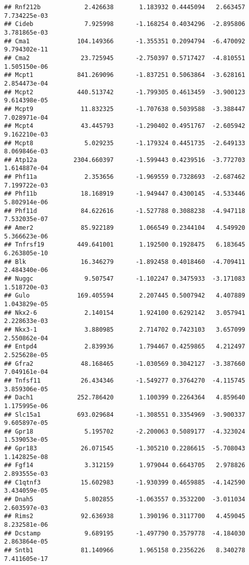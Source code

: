 \documentclass[
]{article}
\begin{document}
\begin{verbatim}
## Rnf212b            2.426638       1.183932 0.4445094   2.663457 7.734225e-03
## Cideb              7.925998      -1.168254 0.4034296  -2.895806 3.781865e-03
## Cma1             104.149366      -1.355351 0.2094794  -6.470092 9.794302e-11
## Cma2              23.725945      -2.750397 0.5717427  -4.810551 1.505150e-06
## Mcpt1            841.269096      -1.837251 0.5063864  -3.628161 2.854473e-04
## Mcpt2            440.513742      -1.799305 0.4613459  -3.900123 9.614398e-05
## Mcpt9             11.832325      -1.707638 0.5039588  -3.388447 7.028971e-04
## Mcpt4             43.445793      -1.290402 0.4951767  -2.605942 9.162210e-03
## Mcpt8              5.029235      -1.179324 0.4451735  -2.649133 8.069846e-03
## Atp12a          2304.660397      -1.599443 0.4239516  -3.772703 1.614887e-04
## Phf11a             2.353656      -1.969559 0.7328693  -2.687462 7.199722e-03
## Phf11b            18.168919      -1.949447 0.4300145  -4.533446 5.802914e-06
## Phf11d            84.622616      -1.527788 0.3088238  -4.947118 7.532035e-07
## Amer2             85.922189       1.066549 0.2344104   4.549920 5.366623e-06
## Tnfrsf19         449.641001       1.192500 0.1928475   6.183645 6.263805e-10
## Blk               16.346279      -1.892458 0.4018460  -4.709411 2.484340e-06
## Nuggc              9.507547      -1.102247 0.3475933  -3.171083 1.518720e-03
## Gulo             169.405594       2.207445 0.5007942   4.407889 1.043829e-05
## Nkx2-6             2.140154       1.924100 0.6292142   3.057941 2.228633e-03
## Nkx3-1             3.880985       2.714702 0.7423103   3.657099 2.550862e-04
## Entpd4             2.839936       1.794467 0.4259865   4.212497 2.525628e-05
## Gfra2             48.168465      -1.030569 0.3042127  -3.387660 7.049161e-04
## Tnfsf11           26.434346      -1.549277 0.3764270  -4.115745 3.859306e-05
## Dach1            252.786420       1.100399 0.2264364   4.859640 1.175995e-06
## Slc15a1          693.029684      -1.308551 0.3354969  -3.900337 9.605897e-05
## Gpr18              5.195702      -2.200063 0.5089177  -4.323024 1.539053e-05
## Gpr183            26.071545      -1.305210 0.2286615  -5.708043 1.142825e-08
## Fgf14              3.312159       1.979044 0.6643705   2.978826 2.893555e-03
## C1qtnf3           15.602983      -1.930399 0.4659885  -4.142590 3.434059e-05
## Dnah5              5.802855      -1.063557 0.3532200  -3.011034 2.603597e-03
## Rims2             92.636938       1.390196 0.3117700   4.459045 8.232581e-06
## Dcstamp            9.689195      -1.497790 0.3579778  -4.184030 2.863864e-05
## Sntb1             81.140966       1.965158 0.2356226   8.340278 7.411605e-17

\end{verbatim}
\end{document}
